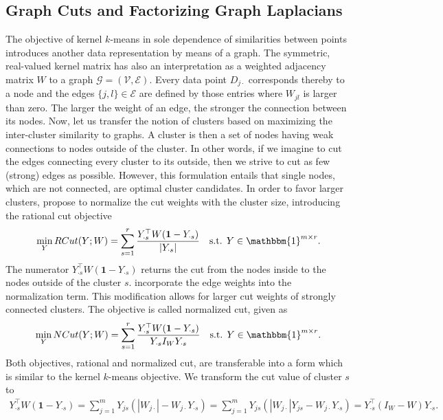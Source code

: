 \subsection{Graph Cuts and Factorizing Graph Laplacians} \label{sec:ZS:graphCut}
The objective of kernel $k$-means in sole dependence of similarities between points introduces another data representation by means of a graph. The symmetric, real-valued kernel matrix has also an interpretation as a weighted adjacency matrix $W$ to a graph $\mathcal{G}=(\mathcal{V},\mathcal{E})$. Every data point $D_{j\cdot}$ corresponds thereby to a node and the edges $\{j,l\}\in\mathcal{E}$ are defined by those entries where $W_{jl}$ is larger than zero. The larger the weight of an edge, the stronger the connection between its nodes. Now, let us transfer the notion of clusters based on maximizing the inter-cluster similarity to graphs. A cluster is then a set of nodes having weak connections to nodes outside of the cluster. In other words, if  we imagine to cut the edges connecting every cluster to its outside, then we strive to cut as few (strong) edges as possible. However, this formulation entails that single nodes, which are not connected, are optimal cluster candidates. In order to favor larger clusters, \cite{hagen1992new} propose to normalize the cut weights with the cluster size, introducing the rational cut objective
\begin{align*}
\min_Y RCut(Y;W) = \sum_{s=1}^r \frac{Y_{\cdot s}^\top W(\mathbf{1}-Y_{\cdot s})}{|Y_{\cdot s}|} \quad \text{s.t. } Y\in \mathbbm{1}^{m\times r}.
\end{align*}
The numerator $Y_{\cdot s}^\top W(\mathbf{1}-Y_{\cdot s})$ returns the cut from the nodes inside to the nodes outside of the cluster $s$.
\cite{shi2000normalized} incorporate the edge weights into the normalization term. This modification allows for larger cut weights of strongly connected clusters. The objective is called normalized cut, given as
\begin{align*}
\min_Y NCut(Y;W) = \sum_{s=1}^r \frac{Y_{\cdot s}^\top W(\mathbf{1}-Y_{\cdot s})}{Y_{\cdot s}I_WY_{\cdot s}} \quad \text{s.t. } Y\in \mathbbm{1}^{m\times r}.
\end{align*}
Both objectives, rational and normalized cut, are transferable into a form which is similar to the kernel $k$-means objective. We transform the cut value of cluster $s$ to
\begin{align*}
	Y_{\cdot s}^\top W(\mathbf{1}-Y_{\cdot s})=\sum_{j=1}^m Y_{js}(|W_{j\cdot}|-W_{j\cdot}Y_{\cdot s}) =  \sum_{j=1}^m Y_{js}(|W_{j\cdot}|Y_{js}-W_{j\cdot}Y_{\cdot s}) = Y_{\cdot s}^\top (I_W-W)Y_{\cdot s}.
\end{align*}
